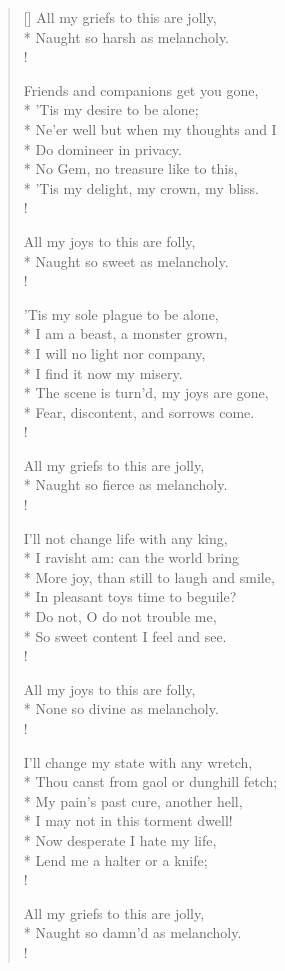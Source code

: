 \begin{verse}[\versewidth]
All my griefs to this are jolly,\\*
Naught so harsh as melancholy.\\!

Friends and companions get you gone,\\*
'Tis my desire to be alone;\\*
Ne'er well but when my thoughts and I\\*
Do domineer in privacy.\\*
No Gem, no treasure like to this,\\*
'Tis my delight, my crown, my bliss.\\!

All my joys to this are folly,\\*
Naught so sweet as melancholy.\\!

'Tis my sole plague to be alone,\\*
I am a beast, a monster grown,\\*
I will no light nor company,\\*
I find it now my misery.\\*
The scene is turn'd, my joys are gone,\\*
Fear, discontent, and sorrows come.\\!

All my griefs to this are jolly,\\*
Naught so fierce as melancholy.\\!

I'll not change life with any king,\\*
I ravisht am: can the world bring\\*
More joy, than still to laugh and smile,\\*
In pleasant toys time to beguile?\\*
Do not, O do not trouble me,\\*
So sweet content I feel and see.\\!

All my joys to this are folly,\\*
None so divine as melancholy.\\!

I'll change my state with any wretch,\\*
Thou canst from gaol or dunghill fetch;\\*
My pain's past cure, another hell,\\*
I may not in this torment dwell!\\*
Now desperate I hate my life,\\*
Lend me a halter or a knife;\\!

All my griefs to this are jolly,\\*
Naught so damn'd as melancholy.\\!
\end{verse}
